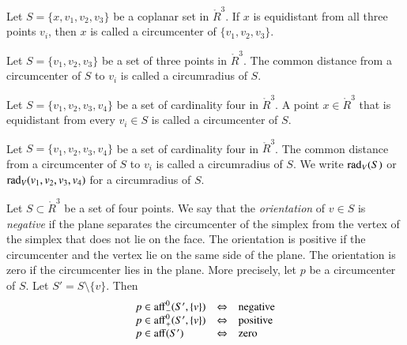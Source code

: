 \begin{definition}[circumcenter]
Let $S=\{x,v_1,v_2,v_3\}$ be a coplanar set in $\ring{R}^3$.  If $x$ 
is equidistant from all three points $v_i$, then $x$ is called a
circumcenter of $\{v_1,v_2,v_3\}$.
\end{definition}

\begin{definition}[circumradius]  
Let $S=\{v_1,v_2,v_3\}$ be 
a set of three points in $\ring{R}^3$.
The common distance from a circumcenter of $S$ to $v_i$ is called a
circumradius of $S$.  
\end{definition}

\begin{definition}[circumcenter]
Let $S=\{v_1,v_2,v_3,v_4\}$ be a set of cardinality four in $\ring{R}^3$.  
A point $x\in\ring{R}^3$ 
that is equidistant from every $v_i\in S$ is called a
circumcenter of $S$.  
\end{definition}

\begin{definition}  
Let $S=\{v_1,v_2,v_3,v_4\}$ be 
a set of cardinality four in $\ring{R}^3$.
The common distance from a circumcenter of $S$ to $v_i$ is called a
circumradius of $S$.  We write
$\operatorname{rad}_V(S)$ or $\operatorname{rad}_V(v_1,v_2,v_3,v_4)$ for a circumradius of $S$.
\end{definition}


\begin{definition}[orientation] 
Let $S\subset\ring{R}^3$ be a set of four points.
We say that the {\it orientation\/} of $v\in S$ is
{\it negative} if the plane separates the
circumcenter of the simplex from the vertex of the simplex that
does not lie on the face.  The orientation is positive if the
circumcenter and the vertex lie on the same side of the plane. The
orientation is zero if the circumcenter lies in the plane.
More precisely, let $p$ be a circumcenter of $S$.  Let $S'=S\setminus\{v\}$.  
Then
   $$
   \begin{array}{lll}
     p\in {\operatorname{aff}}_-^0(S',\{v\}) &\Leftrightarrow &\text{negative}\\
     p\in {\operatorname{aff}}_+^0(S',\{v\}) &\Leftrightarrow &\text{positive}\\
     p\in {\operatorname{aff}} (S') &\Leftrightarrow &\text{zero}\\
     \end{array}
   $$
\end{definition}

